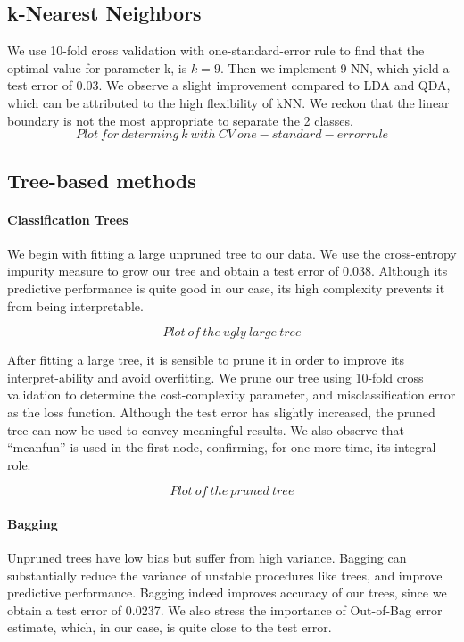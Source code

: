 \subsection{k-Nearest Neighbors}
We use \num{10}-fold cross validation with one-standard-error rule to find that the optimal value for parameter k, is $k=9$. Then we implement \num{9}-NN, which yield a test error of \num{0.03}. We observe a slight improvement compared to LDA and QDA, which can be attributed to the high flexibility of kNN. We reckon that the linear boundary is not the most appropriate to separate the \num{2} classes.
$$ Plot ~ for ~ determing ~ k ~ with ~ CV~ one-standard-error rule $$ 

\subsection{Tree-based methods}

\paragraph{Classification Trees}
We begin with fitting a large unpruned tree to our data. We use the cross-entropy impurity measure to grow our tree and obtain a test error of \num{0.038}. Although its predictive performance is quite good in our case, its high complexity prevents it from being interpretable.

$$ Plot ~ of ~ the ~ ugly ~ large ~tree$$


After fitting a large tree, it is sensible to prune it in order to improve its interpret-ability and avoid overfitting. We prune our tree using \num{10}-fold cross validation to determine the cost-complexity parameter, and misclassification error as the loss function. Although the test error has slightly increased, the pruned tree can now be used to convey meaningful results. We also observe that ``meanfun'' is used in the first node, confirming, for one more time, its integral role.

$$ Plot ~ of ~ the ~ pruned~ tree$$

\paragraph{Bagging}
Unpruned trees have low bias but suffer from high variance. Bagging can substantially reduce the variance of unstable procedures like trees, and improve predictive performance. Bagging indeed improves accuracy of our trees, since we obtain a test error of \num{0.0237}. We also stress the importance of Out-of-Bag error estimate, which, in our case, is quite close to the test error.

